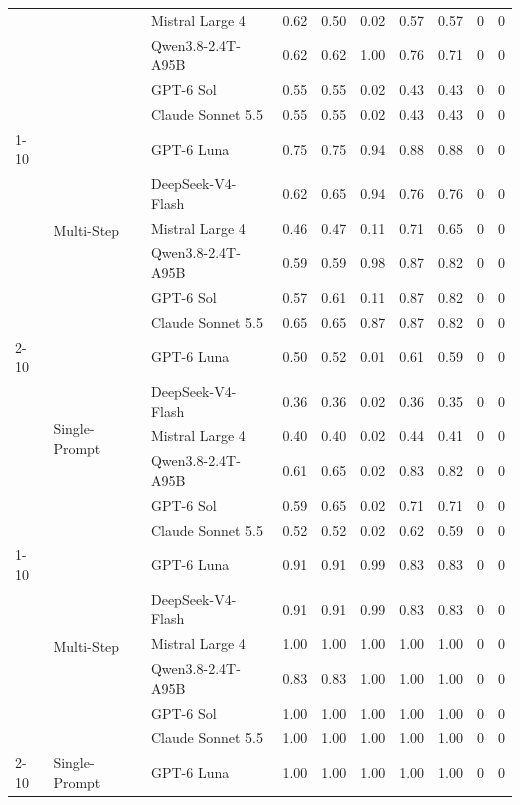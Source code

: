 \begin{tabular}{lllrrrrrrr}
 &  & Mistral Large 4 & 0.62 & 0.50 & 0.02 & 0.57 & 0.57 & 0 & 0 \\
 &  & Qwen3.8-2.4T-A95B & 0.62 & 0.62 & 1.00 & 0.76 & 0.71 & 0 & 0 \\
 &  & GPT-6 Sol & 0.55 & 0.55 & 0.02 & 0.43 & 0.43 & 0 & 0 \\
 &  & Claude Sonnet 5.5 & 0.55 & 0.55 & 0.02 & 0.43 & 0.43 & 0 & 0 \\
\cline{1-10} \cline{2-10}
\multirow[t]{12}{*}{sisu} & \multirow[t]{6}{*}{Multi-Step} & GPT-6 Luna & 0.75 & 0.75 & 0.94 & 0.88 & 0.88 & 0 & 0 \\
 &  & DeepSeek-V4-Flash & 0.62 & 0.65 & 0.94 & 0.76 & 0.76 & 0 & 0 \\
 &  & Mistral Large 4 & 0.46 & 0.47 & 0.11 & 0.71 & 0.65 & 0 & 0 \\
 &  & Qwen3.8-2.4T-A95B & 0.59 & 0.59 & 0.98 & 0.87 & 0.82 & 0 & 0 \\
 &  & GPT-6 Sol & 0.57 & 0.61 & 0.11 & 0.87 & 0.82 & 0 & 0 \\
 &  & Claude Sonnet 5.5 & 0.65 & 0.65 & 0.87 & 0.87 & 0.82 & 0 & 0 \\
\cline{2-10}
 & \multirow[t]{6}{*}{Single-Prompt} & GPT-6 Luna & 0.50 & 0.52 & 0.01 & 0.61 & 0.59 & 0 & 0 \\
 &  & DeepSeek-V4-Flash & 0.36 & 0.36 & 0.02 & 0.36 & 0.35 & 0 & 0 \\
 &  & Mistral Large 4 & 0.40 & 0.40 & 0.02 & 0.44 & 0.41 & 0 & 0 \\
 &  & Qwen3.8-2.4T-A95B & 0.61 & 0.65 & 0.02 & 0.83 & 0.82 & 0 & 0 \\
 &  & GPT-6 Sol & 0.59 & 0.65 & 0.02 & 0.71 & 0.71 & 0 & 0 \\
 &  & Claude Sonnet 5.5 & 0.52 & 0.52 & 0.02 & 0.62 & 0.59 & 0 & 0 \\
\cline{1-10} \cline{2-10}
\multirow[t]{12}{*}{tax} & \multirow[t]{6}{*}{Multi-Step} & GPT-6 Luna & 0.91 & 0.91 & 0.99 & 0.83 & 0.83 & 0 & 0 \\
 &  & DeepSeek-V4-Flash & 0.91 & 0.91 & 0.99 & 0.83 & 0.83 & 0 & 0 \\
 &  & Mistral Large 4 & 1.00 & 1.00 & 1.00 & 1.00 & 1.00 & 0 & 0 \\
 &  & Qwen3.8-2.4T-A95B & 0.83 & 0.83 & 1.00 & 1.00 & 1.00 & 0 & 0 \\
 &  & GPT-6 Sol & 1.00 & 1.00 & 1.00 & 1.00 & 1.00 & 0 & 0 \\
 &  & Claude Sonnet 5.5 & 1.00 & 1.00 & 1.00 & 1.00 & 1.00 & 0 & 0 \\
\cline{2-10}
 & \multirow[t]{6}{*}{Single-Prompt} & GPT-6 Luna & 1.00 & 1.00 & 1.00 & 1.00 & 1.00 & 0 & 0 \\

\end{tabular}
